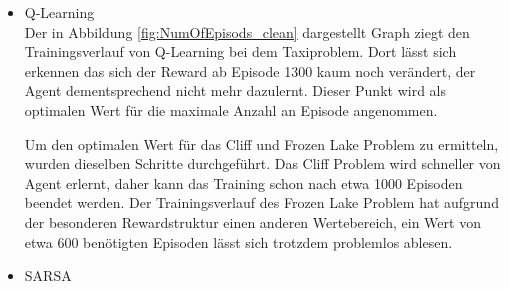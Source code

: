 \begin{itemize}
    \item Q-Learning\\
    Der in Abbildung \ref{fig:NumOfEpisods_clean} dargestellt Graph ziegt den Trainingsverlauf von Q-Learning bei dem Taxiproblem. Dort lässt sich erkennen das sich der Reward ab Episode 1300 kaum noch verändert, der Agent dementsprechend nicht mehr dazulernt. 
    Dieser Punkt wird als optimalen Wert für die maximale Anzahl an Episode angenommen.

    Um den optimalen Wert für das Cliff und Frozen Lake Problem zu ermitteln, wurden dieselben Schritte durchgeführt.
    Das Cliff Problem wird schneller von Agent erlernt, daher kann das Training schon nach etwa 1000 Episoden beendet werden.
    Der Trainingsverlauf des Frozen Lake Problem hat aufgrund der besonderen Rewardstruktur einen anderen Wertebereich, ein Wert von etwa 600 benötigten Episoden lässt sich trotzdem problemlos ablesen.
    \item SARSA\\
    
    
\end{itemize}


